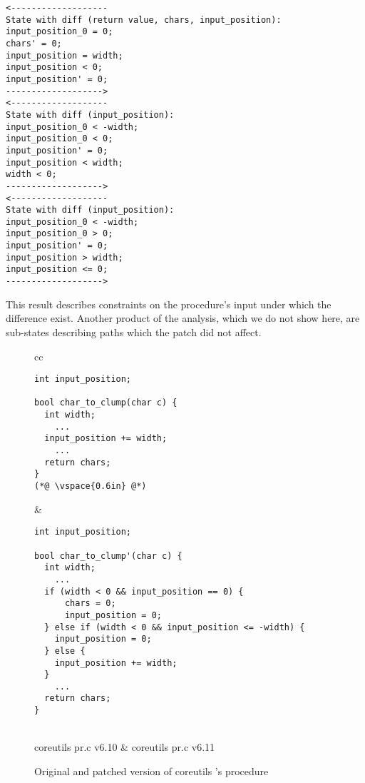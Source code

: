 \begin{lstlisting}
<-------------------
State with diff (return value, chars, input_position):
input_position_0 = 0;
chars' = 0;
input_position = width;
input_position < 0;
input_position' = 0;
------------------->
<-------------------
State with diff (input_position):
input_position_0 < -width;
input_position_0 < 0;
input_position' = 0;
input_position < width;
width < 0;
------------------->
<-------------------
State with diff (input_position):
input_position_0 < -width;
input_position_0 > 0;
input_position' = 0;
input_position > width;
input_position <= 0;
------------------->
\end{lstlisting}
This result describes constraints on the procedure's input under which the difference exist. Another product of the analysis, which we do not show here, are sub-states describing paths which the patch did not affect.

\begin{figure*}
\centering
\begin{tabular}{cc}
\begin{lstlisting}
int input_position;

bool char_to_clump(char c) {
  int width;
    ...
  input_position += width;
    ...
  return chars;
}
(*@ \vspace{0.6in} @*)
\end{lstlisting}
\hspace{1.0in}
&
\begin{lstlisting}
int input_position;

bool char_to_clump'(char c) {
  int width;
    ...
  if (width < 0 && input_position == 0) {
      chars = 0;
      input_position = 0;
  } else if (width < 0 && input_position <= -width) {
    input_position = 0;
  } else {
    input_position += width;
  }
    ...
  return chars;
}
\end{lstlisting}
\\
coreutils pr.c v6.10 & coreutils pr.c v6.11
\end{tabular}
\caption{Original and patched version of coreutils 's  procedure}
\end{figure*}

